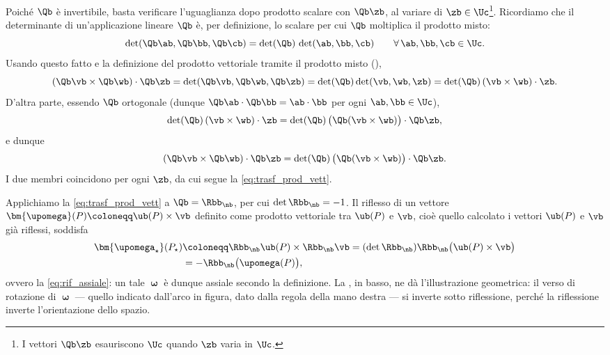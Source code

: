 	Poiché $\Qb$ è invertibile, basta verificare l'uguaglianza dopo prodotto
	scalare con $\Qb\zb$, al variare di $\zb\in\Uc$\footnote{I vettori $\Qb\zb$
	esauriscono $\Uc$ quando $\zb$ varia in $\Uc$.}. Ricordiamo che il
	determinante di un'applicazione lineare $\Qb$ è, per definizione, lo
	scalare per cui $\Qb$ moltiplica il prodotto misto:
	\begin{equation}
		\det(\Qb\ab,\Qb\bb,\Qb\cb)=\det(\Qb)\,\det(\ab,\bb,\cb)
		\qquad\forall\,\ab,\bb,\cb\in\Uc.
	\end{equation}
	Usando questo fatto e la definizione del prodotto vettoriale tramite il
	prodotto misto (),
	\begin{equation}
		(\Qb\vb\times\Qb\wb)\cdot\Qb\zb=\det(\Qb\vb,\Qb\wb,\Qb\zb)
		=\det(\Qb)\det(\vb,\wb,\zb)=\det(\Qb)\,(\vb\times\wb)\cdot\zb.
	\end{equation}
	D'altra parte, essendo $\Qb$ ortogonale (dunque
	$\Qb\ab\cdot\Qb\bb=\ab\cdot\bb$ per ogni $\ab,\bb\in\Uc$),
	\begin{equation}
	\det(\Qb)\,(\vb\times\wb)\cdot\zb= 	\det(\Qb)\,\bigl(\Qb(\vb\times\wb)\bigr)\cdot\Qb\zb,
	\end{equation}
e dunque
\begin{equation}
		(\Qb\vb\times\Qb\wb)\cdot\Qb\zb=	\det(\Qb)\,\bigl(\Qb(\vb\times\wb)\bigr)\cdot\Qb\zb.
\end{equation}
	I due membri coincidono per ogni $\zb$, da cui segue la \eqref{eq:trasf_prod_vett}.
	


\medskip

Applichiamo la \eqref{eq:trasf_prod_vett} a $\Qb=\Rbb_\nb$, per cui
$\det\Rbb_\nb=-1$. Il riflesso di un vettore $	\bm{\upomega}(P)\coloneqq \ub(P)\times\vb $ definito come prodotto vettoriale  tra  $\ub(P)$ e $\vb$,
cioè quello calcolato i vettori $\ub(P)$ e $\vb$ già riflessi, soddisfa
\begin{equation}
\begin{aligned}
	\bm{\upomega_\star}(P_\star)&\coloneqq \Rbb_\nb\ub(P)\times\Rbb_\nb\vb =(\det \Rbb_\nb)\Rbb_\nb \big( \ub(P)\times \vb \big)\\
	&=-\Rbb_\nb\big( \upomega(P) \big), 
\end{aligned}
\end{equation}
ovvero  la \eqref{eq:rif_assiale}: un tale $\bm\upomega$ è dunque assiale
secondo la definizione. La , in basso, ne dà
l'illustrazione geometrica: il verso di rotazione di $\bm{\upomega}$ --- quello indicato dall'arco in figura, dato dalla regola della
mano destra --- si inverte sotto riflessione, perché la riflessione
inverte l'orientazione dello spazio.


